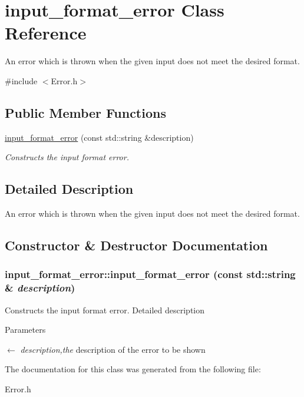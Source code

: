 \hypertarget{classinput__format__error}{
\section{input\_\-format\_\-error Class Reference}
\label{classinput__format__error}
}


An error which is thrown when the given input does not meet the desired format.  


{\ttfamily \#include $<$Error.h$>$}\subsection*{Public Member Functions}
\begin{DoxyCompactItemize}
\item 
\hyperlink{classinput__format__error_a67a81efef4ee51b933d5c1a28f9bea79}{input\_\-format\_\-error} (const std::string \&description)
\begin{DoxyCompactList}\small\item\em Constructs the input format error. \item\end{DoxyCompactList}\end{DoxyCompactItemize}


\subsection{Detailed Description}
An error which is thrown when the given input does not meet the desired format. 

\subsection{Constructor \& Destructor Documentation}
\hypertarget{classinput__format__error_a67a81efef4ee51b933d5c1a28f9bea79}{
\subsubsection[{input\_\-format\_\-error}]{\setlength{\rightskip}{0pt plus 5cm}input\_\-format\_\-error::input\_\-format\_\-error (const std::string \& {\em description})}}
\label{classinput__format__error_a67a81efef4ee51b933d5c1a28f9bea79}


Constructs the input format error. Detailed description 
\begin{DoxyParams}{Parameters}
\item[\mbox{$\leftarrow$} {\em description,the}]description of the error to be shown \end{DoxyParams}


The documentation for this class was generated from the following file:\begin{DoxyCompactItemize}
\item 
Error.h\end{DoxyCompactItemize}
